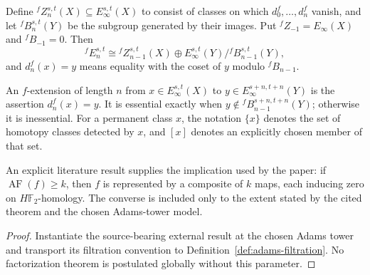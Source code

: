 

\begin{definition}
  \label{def:fess-cycles-boundaries}
  \notready
  Define ${}^fZ_n^{s,t}(X)\subseteq E_\infty^{s,t}(X)$ to consist of classes
  on which $d_0^f,\ldots,d_n^f$ vanish, and let
  ${}^fB_n^{s,t}(Y)$ be the subgroup generated by their images.  Put
  ${}^fZ_{-1}=E_\infty(X)$ and ${}^fB_{-1}=0$.  Then
  \[
    {}^fE_n^{s,t}\cong{}^fZ_{n-1}^{s,t}(X)\oplus
      E_\infty^{s,t}(Y)/{}^fB_{n-1}^{s,t}(Y),
  \]
  and $d_n^f(x)=y$ means equality with the coset of $y$ modulo
  ${}^fB_{n-1}$.
\end{definition}

\begin{definition}
  \label{def:f-extension-essential}
  \notready
  An $f$-extension of length $n$ from
  $x\in E_\infty^{s,t}(X)$ to
  $y\in E_\infty^{s+n,t+n}(Y)$ is the assertion $d_n^f(x)=y$.
  It is essential exactly when
  $y\notin{}^fB_{n-1}^{s+n,t+n}(Y)$; otherwise it is inessential.  For a
  permanent class $x$, the notation $\{x\}$ denotes the set of homotopy
  classes detected by $x$, and $[x]$ denotes an explicitly chosen member of
  that set.
\end{definition}

\begin{theorem}
  \label{thm:external-map-filtration-factorization}
  \notready
  An explicit literature result supplies the implication used by the paper:
  if $\operatorname{AF}(f)\ge k$, then $f$ is represented by a composite of
  $k$ maps, each inducing zero on $H\mathbb F_2$-homology.  The converse is
  included only to the extent stated by the cited theorem and the chosen
  Adams-tower model.
\end{theorem}

\begin{proof}
  Instantiate the source-bearing external result at the chosen Adams tower and
  transport its filtration convention to Definition~\ref{def:adams-filtration}.
  No factorization theorem is postulated globally without this parameter.
\end{proof}

